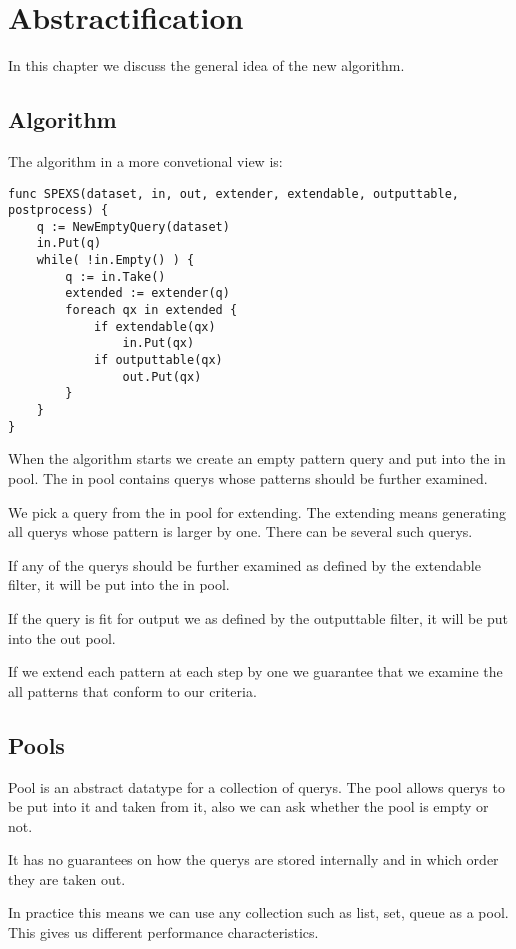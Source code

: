 \chapter{Abstractification}

In this chapter we discuss the general idea of the new algorithm.

\section{Algorithm}

The algorithm in a more convetional view is:

\begin{verbatim}
func SPEXS(dataset, in, out, extender, extendable, outputtable, postprocess) {
	q := NewEmptyQuery(dataset)
	in.Put(q)
	while( !in.Empty() ) {
		q := in.Take()
		extended := extender(q)
		foreach qx in extended {
			if extendable(qx)
				in.Put(qx)
			if outputtable(qx)
				out.Put(qx)
		}
	}
}
\end{verbatim}

When the algorithm starts we create an empty pattern query and put 
into the in pool. The in pool contains querys whose patterns
should be further examined.

We pick a query from the in pool for extending. The extending means
generating all querys whose pattern is larger by one. There can be
several such querys.

If any of the querys should be further examined as defined by the
extendable filter, it will be put into the in pool.

If the query is fit for output we as defined by the outputtable filter,
it will be put into the out pool.

If we extend each pattern at each step by one we guarantee that we
examine the all patterns that conform to our criteria.

\section{Pools}

Pool is an abstract datatype for a collection of querys. The pool
allows querys to be put into it and taken from it, also we can
ask whether the pool is empty or not.

It has no guarantees on how the querys are stored internally and
in which order they are taken out.

In practice this means we can use any collection such as list, set,
queue as a pool. This gives us different performance characteristics.

